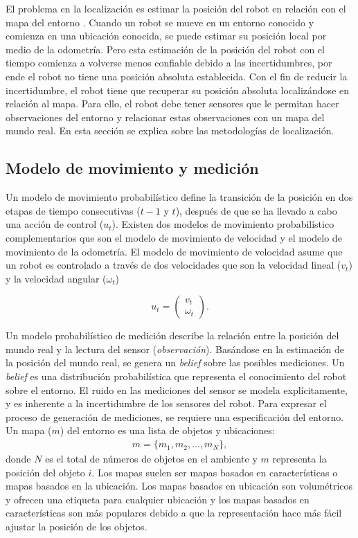 El problema en la localización es estimar la posición del robot en 
relación con el mapa del entorno \cite{dellaert1999monte}. Cuando un robot 
se mueve en un entorno conocido y comienza en una ubicación conocida, se puede 
estimar su posición local por medio de la odometría. Pero esta estimación de la 
posición del robot con el tiempo comienza a volverse menos confiable debido a las 
incertidumbres, por ende el robot no tiene una posición absoluta establecida. Con el 
fin de reducir la incertidumbre, el robot tiene que recuperar su posición absoluta 
localizándose en relación al mapa. Para ello, el robot debe tener sensores que 
le permitan hacer observaciones del entorno y relacionar estas observaciones con un 
mapa del mundo real. En esta sección se explica sobre las metodologías de localización.

\subsection{Modelo de movimiento y medici\'on}

Un modelo de movimiento probabil\'istico define la transici\'on de la posici\'on 
en dos etapas de tiempo consecutivas ($t-1$ y $t$), despu\'es de que se ha llevado 
a cabo una acci\'on de control ($u_{t}$). Existen dos modelos de movimiento 
probabil\'istico complementarios que son el modelo de movimiento de velocidad y 
el modelo de movimiento de la odometr\'ia. El modelo de movimiento de velocidad 
asume que un robot es controlado a trav\'es de dos velocidades que son la 
velocidad lineal ($v_{t}$) y la velocidad angular ($\omega_{t}$)

\begin{equation}
\label{eqn:modelMotion}
u_{t} = \begin{pmatrix}
v_{t} \\
\omega_{t}
\end{pmatrix}.
\end{equation}

Un modelo probabilístico de medición describe la relación entre la posición 
del mundo real y la lectura del sensor (\textit{observación}). Basándose en la 
estimación de la posición del mundo real, se genera un \textit{belief} sobre 
las posibles mediciones. Un \textit{belief} es una distribución probabilística que 
representa el conocimiento del robot sobre el entorno. El ruido en las mediciones 
del sensor se modela explícitamente, y es inherente a la incertidumbre de los sensores 
del robot. Para expresar el proceso de generación de mediciones, se requiere una 
especificación del entorno. Un mapa ($m$) del entorno es una lista de objetos y 
ubicaciones:
\begin{align}
m =\{m_{1}, m_{2}, \ldots, m_{N}\},
\end{align}
donde $N$ es el total de n\'umeros de objetos en el ambiente y $m$
representa la posición del objeto $i$. Los mapas suelen 
ser mapas basados en caracter\'isticas o mapas basados en la ubicaci\'on. Los 
mapas basados en ubicación son volumétricos y ofrecen una etiqueta para cualquier 
ubicación y los mapas basados en características son más populares debido a que 
la representación hace más fácil ajustar la posición de los objetos.

